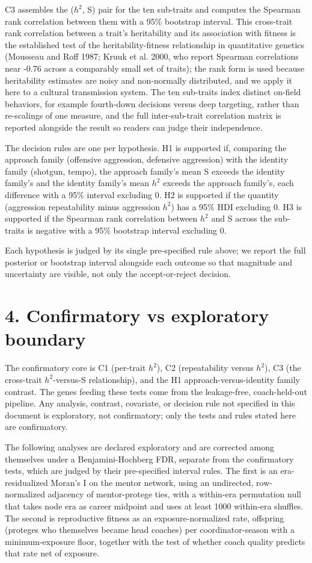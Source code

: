\documentclass[11pt]{article}
\begin{document}
C3 assembles the ($h^{2}$, S) pair for the ten sub-traits and computes the Spearman rank correlation between them with a 95\% bootstrap interval. This cross-trait rank correlation between a trait's heritability and its association with fitness is the established test of the heritability-fitness relationship in quantitative genetics (Mousseau and Roff 1987; Kruuk et al. 2000, who report Spearman correlations near -0.76 across a comparably small set of traits); the rank form is used because heritability estimates are noisy and non-normally distributed, and we apply it here to a cultural transmission system. The ten sub-traits index distinct on-field behaviors, for example fourth-down decisions versus deep targeting, rather than re-scalings of one measure, and the full inter-sub-trait correlation matrix is reported alongside the result so readers can judge their independence.

The decision rules are one per hypothesis. H1 is supported if, comparing the approach family (offensive aggression, defensive aggression) with the identity family (shotgun, tempo), the approach family's mean S exceeds the identity family's and the identity family's mean $h^{2}$ exceeds the approach family's, each difference with a 95\% interval excluding 0. H2 is supported if the quantity (aggression repeatability minus aggression $h^{2}$) has a 95\% HDI excluding 0. H3 is supported if the Spearman rank correlation between $h^{2}$ and S across the sub-traits is negative with a 95\% bootstrap interval excluding 0.

Each hypothesis is judged by its single pre-specified rule above; we report the full posterior or bootstrap interval alongside each outcome so that magnitude and uncertainty are visible, not only the accept-or-reject decision.

\section*{4. Confirmatory vs exploratory boundary}

The confirmatory core is C1 (per-trait $h^{2}$), C2 (repeatability versus $h^{2}$), C3 (the cross-trait $h^{2}$-versus-S relationship), and the H1 approach-versus-identity family contrast. The genes feeding these tests come from the leakage-free, coach-held-out pipeline. Any analysis, contrast, covariate, or decision rule not specified in this document is exploratory, not confirmatory; only the tests and rules stated here are confirmatory.

The following analyses are declared exploratory and are corrected among themselves under a Benjamini-Hochberg FDR, separate from the confirmatory tests, which are judged by their pre-specified interval rules. The first is an era-residualized Moran's I on the mentor network, using an undirected, row-normalized adjacency of mentor-protege ties, with a within-era permutation null that takes node era as career midpoint and uses at least 1000 within-era shuffles. The second is reproductive fitness as an exposure-normalized rate, offspring (proteges who themselves became head coaches) per coordinator-season with a minimum-exposure floor, together with the test of whether coach quality predicts that rate net of exposure.
\end{document}
